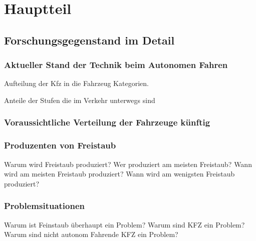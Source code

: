 \newpage
\chapter{Hauptteil}

\section{Forschungsgegenstand im Detail}
\subsection{Aktueller Stand der Technik beim Autonomen Fahren}

Aufteilung der \ac{Kfz} in die Fahrzeug Kategorien.

Anteile der Stufen die im Verkehr unterwegs sind

\subsection{Voraussichtliche Verteilung der Fahrzeuge künftig}

\subsection{Produzenten von Freistaub}

Warum wird Freistaub produziert?
Wer produziert am meisten Freistaub?
Wann wird am meisten Freistaub produziert?
Wann wird am wenigsten Freistaub produziert?

\subsection{Problemsituationen}

Warum ist Feinstaub überhaupt ein Problem?
Warum sind KFZ ein Problem?
Warum sind nicht autonom Fahrende KFZ ein Problem?



